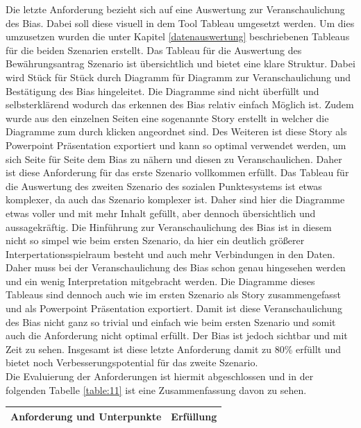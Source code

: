 \begin{onehalfspace}
Die letzte Anforderung bezieht sich auf eine Auswertung zur Veranschaulichung des Bias. Dabei soll diese visuell in dem Tool Tableau umgesetzt werden. Um dies umzusetzen wurden die unter Kapitel \ref{datenauswertung} beschriebenen Tableaus für die beiden Szenarien erstellt. Das Tableau für die Auswertung des Bewährungsantrag Szenario ist übersichtlich und bietet eine klare Struktur. Dabei wird Stück für Stück durch Diagramm für Diagramm zur Veranschaulichung und Bestätigung des Bias hingeleitet. Die Diagramme sind nicht überfüllt und selbsterklärend wodurch das erkennen des Bias relativ einfach Möglich ist. Zudem wurde aus den einzelnen Seiten eine sogenannte Story erstellt in welcher die Diagramme zum durch klicken angeordnet sind. Des Weiteren ist diese Story als Powerpoint Präsentation exportiert und kann so optimal verwendet werden, um sich Seite für Seite dem Bias zu nähern und diesen zu Veranschaulichen. Daher ist diese Anforderung für das erste Szenario vollkommen erfüllt. Das Tableau für die Auswertung des zweiten Szenario des sozialen Punktesystems ist etwas komplexer, da auch das Szenario komplexer ist. Daher sind hier die Diagramme etwas voller und mit mehr Inhalt gefüllt, aber dennoch übersichtlich und aussagekräftig. Die Hinführung zur Veranschaulichung des Bias ist in diesem nicht so simpel wie beim ersten Szenario, da hier ein deutlich größerer Interpertationsspielraum besteht und auch mehr Verbindungen in den Daten. Daher muss bei der Veranschaulichung des Bias schon genau hingesehen werden und ein wenig Interpretation mitgebracht werden. Die Diagramme dieses Tableaus sind dennoch auch wie im ersten Szenario als Story zusammengefasst und als Powerpoint Präsentation exportiert. Damit ist diese Veranschaulichung des Bias nicht ganz so trivial und einfach wie beim ersten Szenario und somit auch die Anforderung nicht optimal erfüllt. Der Bias ist jedoch sichtbar und mit Zeit zu sehen.
Insgesamt ist diese letzte Anforderung damit zu 80\% erfüllt und bietet noch Verbesserungspotential für das zweite Szenario.\\
Die Evaluierung der Anforderungen ist hiermit abgeschlossen und in der folgenden Tabelle \ref{table:11} ist eine Zusammenfassung davon zu sehen.
\begin{table}[h]
    \centering
    \begin{tabular}{|cc|c|}
    \hline
    \multicolumn{2}{|c|}{\textbf{Anforderung und Unterpunkte}}                                                                                                                                                              & \textbf{Erfüllung} \\ \hline

\end{tabular}
\end{table}
\end{onehalfspace}
